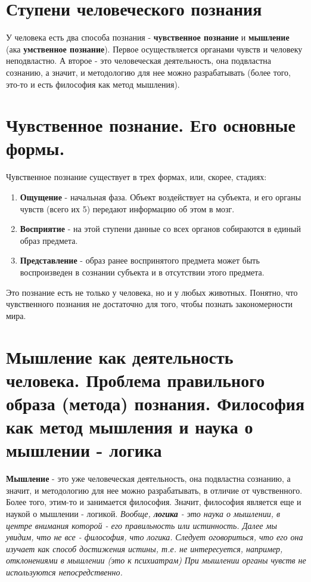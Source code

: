 \documentclass[12pt,a4paper]{article}
\begin{document}
\section{Ступени человеческого познания}
У человека есть два способа познания - \textbf{чувственное познание} и \textbf{мышление} (ака \textbf{умственное познание}).
Первое осуществляется органами чувств и человеку неподвластно.
А второе - это человеческая деятельность, она подвластна сознанию, а значит, и методологию для нее можно разрабатывать (более того, это-то и есть философия как метод мышления).

\section{Чувственное познание. Его основные формы.}
Чувственное познание существует в трех формах, или, скорее, стадиях:
\begin{enumerate}
\item \textbf{Ощущение} - начальная фаза. Объект воздействует на субъекта, и его органы чувств (всего их 5) передают информацию об этом в мозг.
\item \textbf{Восприятие} - на этой ступени данные со всех органов собираются в единый образ предмета.
\item \textbf{Представление} - образ ранее воспринятого предмета может быть воспроизведен в сознании субъекта и в отсутствии этого предмета.
\end{enumerate}
Это познание есть не только у человека, но и у любых животных. Понятно, что чувственного познания не достаточно для того, чтобы познать закономерности мира.

\section{Мышление как деятельность человека. Проблема правильного образа (метода) познания. Философия как метод мышления и наука о мышлении - логика}
\textbf{Мышление} - это уже человеческая деятельность, она подвластна сознанию, а значит, и методологию для нее можно разрабатывать, в отличие от чувственного.
Более того, этим-то и занимается философия.
Значит, философия является еще и наукой о мышлении - логикой.
\textit{Вообще, \textbf{логика} - это наука
о мышлении, в центре внимания которой - его правильность или истинность.\nocite{Sem01} Далее мы увидим, что не все - философия, что логика.
}
\textit{ Следует оговориться, что его она изучает как способ достижения истины, т.е. не интересуется, например, отклонениями в мышлении (это к психиатрам)}
\textit{ При мышлении органы чувств не используются непосредственно. }
\end{document}
